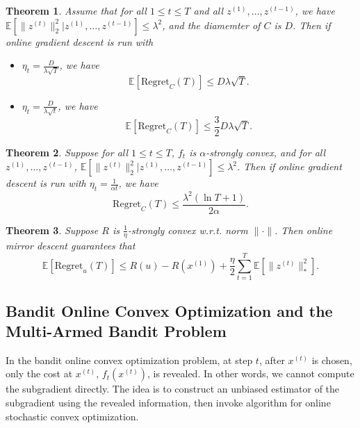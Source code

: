 \documentclass[openany]{book}
\newtheorem{theorem}{Theorem}[chapter]
\theoremstyle{definition}
\theoremstyle{remark}
\begin{document}
\begin{theorem}
    Assume that for all $1\le t\le T$ and all $z^{(1)},\ldots,z^{(t-1)}$, we have $\mathbb{E}[\|z^{(t)}\|_2^2|z^{(1)},\ldots,z^{(t-1)}]\le\lambda^2$, and the diamemter of $C$ is $D$. Then if online gradient descent is run with
    \begin{itemize}
        \item $\eta_t=\frac{D}{\lambda\sqrt{T}}$, we have
        \begin{equation}
            \mathbb{E}[\mathrm{Regret}_C(T)]\le D\lambda\sqrt{T}.
        \end{equation}
        \item $\eta_t=\frac{D}{\lambda\sqrt{t}}$, we have
        \begin{equation}
            \mathbb{E}[\mathrm{Regret}_C(T)]\le \frac{3}{2}D\lambda\sqrt{T}.
        \end{equation}
    \end{itemize}
\end{theorem}
\begin{theorem}
    Suppose for all $1\le t\le T$, $f_t$ is $\alpha$-strongly convex, and for all $z^{(1)},\ldots,z^{(t-1)}$, $\mathbb{E}[\|z^{(t)}\|_2^2|z^{(1)},\ldots,z^{(t-1)}]\le\lambda^2$. Then if online gradient descent is run with $\eta_t=\frac{1}{\alpha t}$, we have
    \begin{equation}
        \mathrm{Regret}_C(T)\le \frac{\lambda^2(\ln T+1)}{2\alpha}.
    \end{equation}
\end{theorem}
\begin{theorem}
    Suppose $R$ is $\frac{1}{\eta}$-strongly convex w.r.t. norm $\|\cdot\|$. Then online mirror descent guarantees that
    \begin{equation}
        \mathbb{E}[\mathrm{Regret}_u(T)]\le R(u)-R(x^{(1)})+\frac{\eta}{2}\sum_{t=1}^{T}\mathbb{E}[\|z^{(t)}\|_*^2].
    \end{equation}
\end{theorem}

\subsection{Bandit Online Convex Optimization and the Multi-Armed Bandit Problem}
In the bandit online convex optimization problem, at step $t$, after $x^{(t)}$ is chosen, only the cost at $x^{(t)}$, $f_t(x^{(t)})$, is revealed. In other words, we cannot compute the subgradient directly. The idea is to construct an unbiased estimator of the subgradient using the revealed information, then invoke algorithm for online stochastic convex optimization.
\end{document}
